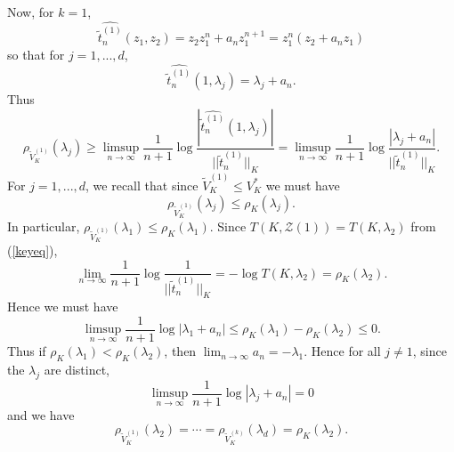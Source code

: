 \documentclass[12pt]{article}
\numberwithin{equation}{section}
\renewcommand{\hat}{\widehat}
\renewcommand{\tilde}{\widetilde}
\newcommand{\calZ}{\mathcal{Z}}
\begin{document}
Now, for $k=1$,
$$\hat {\tilde t_{n}^{(1)}}(z_1,z_2)=z_2z_1^n+a_nz_1^{n+1}=z_1^n(z_2+a_nz_1)$$
so that for $j=1,...,d$,
$$\hat {\tilde t_{n}^{(1)}}(1,\lambda_j)= \lambda_j + a_n.$$
Thus
$$\rho_{\tilde V_{K}^{(1)}}(\lambda_j)\geq \limsup_{n\to \infty} \frac{1}{n+1}\log \frac{| \hat {\tilde t_{n}^{(1)}}(1,\lambda_j)|}{||\tilde t_{n}^{(1)}||_K}=\limsup_{n\to \infty} \frac{1}{n+1}\log \frac{| \lambda_j + a_n|}{||\tilde t_{n}^{(1)}||_K}.$$
For $j=1,...,d$, we recall that since $\tilde V_{K}^{(1)}\leq V_K^*$ we must have 
$$\rho_{\tilde V_{K}^{(1)}}(\lambda_j)\leq  \rho_K(\lambda_{j}).$$
In particular, $\rho_{\tilde V_{K}^{(1)}}(\lambda_1)\leq  \rho_K(\lambda_{1})$. Since $T(K,\calZ(1))=T(K,\lambda_{2})$ from (\ref{keyeq}), 
$$\lim_{n\to \infty} \frac{1}{n+1}\log \frac{1}{||\tilde t_{n}^{(1)}||_K}=-\log T(K,\lambda_{2}) =\rho_K(\lambda_2).$$
Hence we must have  
$$\limsup_{n\to \infty} \frac{1}{n+1}\log |\lambda_1 + a_n| \leq  \rho_K(\lambda_{1})- \rho_K(\lambda_{2})\leq 0.$$
Thus if $\rho_K(\lambda_{1}) < \rho_K(\lambda_{2})$, then $\lim_{n\to \infty}a_n = -\lambda_1$. Hence for all $j\not = 1$, since the $\lambda_j$ are distinct,
$$\limsup_{n\to \infty}  \frac{1}{n+1}\log |\lambda_j + a_n|= 0$$
and we have 
$$\rho_{\tilde V_{K}^{(1)}}(\lambda_2)= \cdots = \rho_{\tilde V_{K}^{(k)}}(\lambda_{d})=\rho_K(\lambda_{2}).$$
\end{document}
